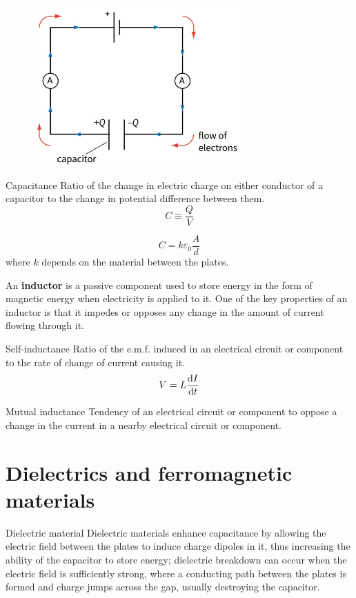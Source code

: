 \begin{figure}[H]
    \centering
    \includegraphics[width=8cm]{images/capacitor.jpg}
\end{figure}

\begin{defn}{Capacitance}{}
Ratio of the change in electric charge on either conductor of a capacitor to the change in potential difference between them.
\begin{equation}
{C \equiv \frac{Q}{V}
}\end{equation}
\end{defn}

\[ C=k\varepsilon_0\frac{A}{d} \]
where $k$ depends on the material between the plates.

An \textbf{inductor} is a passive component used to store energy in the form of magnetic energy when electricity is applied to it. One of the key properties of an inductor is that it impedes or opposes any change in the amount of current flowing through it.

\begin{defn}{Self-inductance}{}
Ratio of the e.m.f. induced in an electrical circuit or component to the rate of change of current causing it.
\[ V = L \dv{I}{t} \]
\end{defn}

\begin{defn}{Mutual inductance}{}
Tendency of an electrical circuit or component to oppose a change in the current in a nearby electrical circuit or component.
\end{defn}

\section{Dielectrics and ferromagnetic materials}
\begin{defn}{Dielectric material}{}
Dielectric materials enhance capacitance by allowing the electric field between the plates to induce charge dipoles in it, thus increasing the ability of the capacitor to store energy; dielectric breakdown can occur when the electric field is sufficiently strong, where a conducting path between the plates is formed and charge jumps across the gap, usually destroying the capacitor.
\end{defn}

